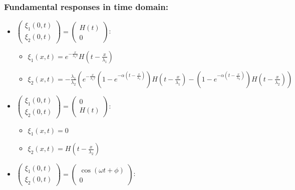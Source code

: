 \documentclass[preprint]{elsarticle}
\begin{document}
\subsubsection{Fundamental responses in time domain:}
\begin{itemize}
\item $\left(\begin{array}{c}
\xi_{1}\left(0,t\right)\\
\xi_{2}\left(0,t\right)
\end{array}\right)=\left(\begin{array}{c}
H\left(t\right)\\
0
\end{array}\right)$:

\begin{itemize}
\item $\xi_{1}\left(x,t\right)=e^{-\frac{x}{\lambda_{1}\tau}}H\left(t-\frac{x}{\lambda_{1}}\right)$
\item $\xi_{2}\left(x,t\right)=-\frac{\lambda_{1}}{\lambda_{2}}\left(e^{-\frac{x}{\lambda_{1}\tau}}\left(1-e^{-\alpha\left(t-\frac{x}{\lambda_{1}}\right)}\right)H\left(t-\frac{x}{\lambda_{1}}\right)-\left(1-e^{-\alpha\left(t-\frac{x}{\lambda_{2}}\right)}\right)H\left(t-\frac{x}{\lambda_{2}}\right)\right)$
\end{itemize}
\item $\left(\begin{array}{c}
\xi_{1}\left(0,t\right)\\
\xi_{2}\left(0,t\right)
\end{array}\right)=\left(\begin{array}{c}
0\\
H\left(t\right)
\end{array}\right)$:

\begin{itemize}
\item $\xi_{1}\left(x,t\right)=0$
\item $\xi_{2}\left(x,t\right)=H\left(t-\frac{x}{\lambda_{2}}\right)$
\end{itemize}
\item $\left(\begin{array}{c}
\xi_{1}\left(0,t\right)\\
\xi_{2}\left(0,t\right)
\end{array}\right)=\left(\begin{array}{c}
\cos\left(\omega t+\phi\right)\\
0
\end{array}\right)$:


\end{itemize}
\end{document}
